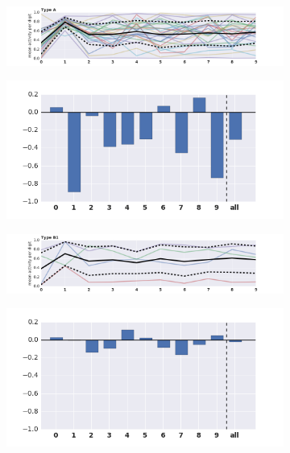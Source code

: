 \documentclass[10pt,a4paper]{article}
\begin{document}
\begin{figure}
\centering
\begin{subfigure}{.7\textwidth}
  \centering
  \includegraphics[width=1\linewidth]{activity_sn_digit1_lay4_mnist.png}
\end{subfigure}%
\begin{subfigure}{.3\textwidth}
  \centering
  \includegraphics[width=1\linewidth]{rel_acc_dig1_lay4_typeA.png}
\end{subfigure}
\hfill

\centering
\begin{subfigure}{.7\textwidth}
  \centering
  \includegraphics[width=1\linewidth]{activity_ih_digit1_lay4_mnist.png}
\end{subfigure}%
\begin{subfigure}{.3\textwidth}
  \centering
  \includegraphics[width=1\linewidth]{rel_acc_dig1_lay4_typeB1.png}
\end{subfigure}


\end{figure}
\end{document}

